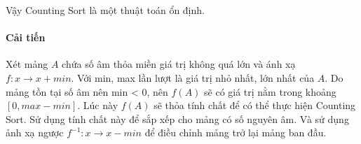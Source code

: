 Vậy Counting Sort là một thuật toán ổn định.

\paragraph{Cải tiến}
Xét mảng $A$ chứa số âm thỏa miền giá trị không quá lớn và ánh xạ $f: x\rightarrow x + min$. Với min, max lần lượt là giá trị nhỏ nhất, lớn nhất của $A$. Do mảng tồn tại số âm nên min < 0, nên $f(A)$ sẽ có giá trị nằm trong khoảng $[0, max - min]$. Lúc này $f(A)$ sẽ thỏa tính chất để có thể thực hiện Counting Sort. Sử dụng tính chất này để sắp xếp cho mảng có số nguyên âm. Và sử dụng ảnh xạ ngược $f^{-1}: x \rightarrow x - min$ để điều chỉnh mảng trở lại mảng ban đầu. 